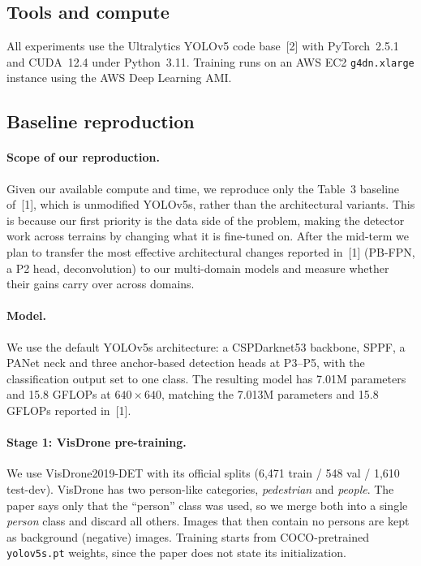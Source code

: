 \documentclass{article}
\begin{document}
\subsection{Tools and compute}
All experiments use the Ultralytics YOLOv5 code base~[2] with PyTorch~2.5.1 and CUDA~12.4 under Python~3.11. Training runs on an AWS EC2 \texttt{g4dn.xlarge} instance using the AWS Deep Learning AMI.
 
\subsection{Baseline reproduction}
\label{sec:repro}

\paragraph{Scope of our reproduction.} Given our available compute and time, we reproduce only the Table~3 baseline of~[1], which is unmodified YOLOv5s, rather than the architectural variants. This is because our first priority is the data side of the problem, making the detector work across terrains by changing what it is fine-tuned on. After the mid-term we plan to transfer the most effective architectural changes reported in~[1] (PB-FPN, a P2 head, deconvolution) to our multi-domain models and measure whether their gains carry over across domains.
 
\paragraph{Model.} We use the default YOLOv5s architecture: a CSPDarknet53 backbone, SPPF, a PANet neck and three anchor-based detection heads at P3--P5, with the classification output set to one class. The resulting model has 7.01M parameters and 15.8 GFLOPs at $640\times640$, matching the 7.013M parameters and 15.8 GFLOPs reported in~[1].
 
\paragraph{Stage 1: VisDrone pre-training.} We use VisDrone2019-DET with its official splits (6,471 train / 548 val / 1,610 test-dev). VisDrone has two person-like categories, \emph{pedestrian} and \emph{people}. The paper says only that the ``person'' class was used, so we merge both into a single \emph{person} class and discard all others. Images that then contain no persons are kept as background (negative) images. Training starts from COCO-pretrained \texttt{yolov5s.pt} weights, since the paper does not state its initialization.
 
\end{document}
